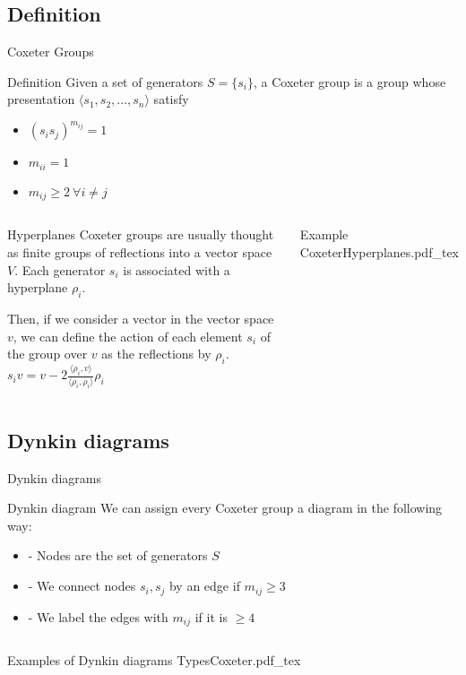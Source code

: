 \documentclass{beamer}
\newcommand{\incfig}[1]{%
\center
\def\svgwidth{0.9\columnwidth}
{#1.pdf_tex}
}
\begin{document}
\subsection{Definition}
\begin{frame}{Coxeter Groups}
  \begin{block}{Definition}
    Given a set of generators $S = \{s_i\}$, a Coxeter group is a group whose presentation $\langle s_1, s_2, \ldots, s_n  \rangle $ satisfy
\begin{itemize}[topsep=-6pt, itemsep=0pt]
  \item $(s_is_j)^{m_{ij}} = 1$
  \item $m_{ii} = 1$
  \item $m_{ij}\ge 2 \ \forall i\neq j$
\end{itemize}
  \end{block}
\begin{columns}[c]
\begin{block}{Hyperplanes}
Coxeter groups are usually thought as finite groups of reflections into a vector space $V$. Each generator $s_i$ is associated with a hyperplane $\rho_i$.

Then, if we consider a vector in the vector space $v$, we can define the action of each element $s_i$ of the group over $v$ as the reflections by $\rho _i$. $s_iv = v - 2\frac{\langle \rho_i, v \rangle }{\langle \rho _i, \rho _i \rangle}\rho _i$
\end{block}
\begin{block}{Example}
\incfig{CoxeterHyperplanes}
\end{block}
\end{columns}
\end{frame}

\subsection{Dynkin diagrams}
\begin{frame}{Dynkin diagrams}
\begin{block}{Dynkin diagram}
 We can assign every Coxeter group a diagram in the following way:
 \begin{itemize}[topsep=-6pt, itemsep=0pt]
   \item - Nodes are the set of generators $S$
   \item - We connect nodes $s_i, s_j$ by an edge if $m_{ij}\ge 3$
   \item - We label the edges with  $m_{ij}$ if it is $\ge 4$
 \end{itemize}
\end{block}
  \begin{columns}[c]
\begin{block}{Examples of Dynkin diagrams} 
  \incfig{TypesCoxeter}
\end{block}
  \end{columns}
\end{frame}
\end{document}
